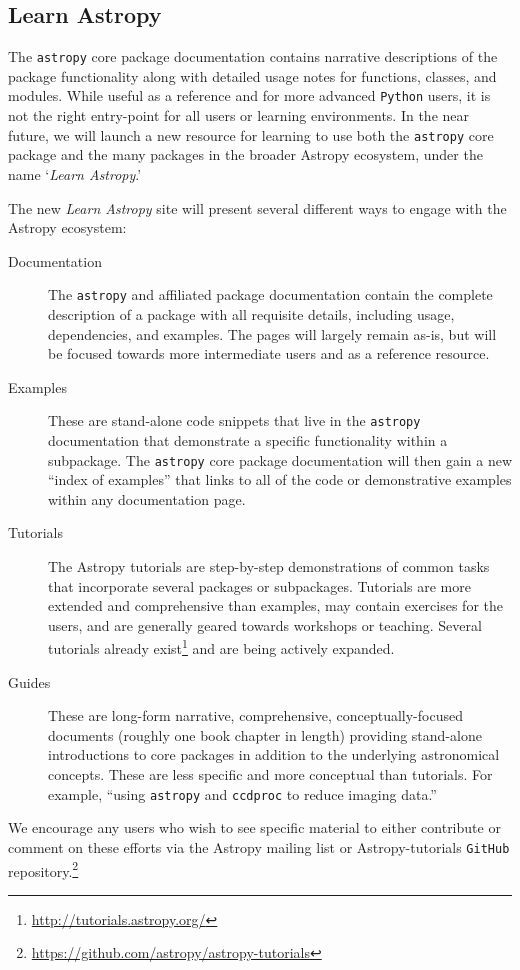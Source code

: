 \documentclass[modern]{aastex61}
\newcommand{\package}[1]{\texttt{#1}\xspace}
\newcommand{\github}{\package{GitHub}}
\newcommand{\python}{\package{Python}}
\newcommand{\astropy}{Astropy\xspace}
\newcommand{\astropypkg}{\package{astropy}}
\begin{document}
\subsection{Learn Astropy}

The \astropypkg core package documentation contains narrative descriptions of
the package functionality along with detailed usage notes for functions, classes, and modules.
While useful as a reference and for more advanced \python users, it is not the
right entry-point for all users or learning environments.
In the near future, we will launch a new resource for learning to use both the
\astropypkg core package and the many packages in the broader \astropy
ecosystem, under the name `\emph{Learn Astropy}.'

The new \emph{Learn Astropy} site will present several different ways to engage
with the \astropy ecosystem:
\begin{description}
    \item[Documentation] The \astropypkg and affiliated package documentation
        contain the complete description of a package with all requisite
        details, including usage, dependencies, and examples.
        The pages will largely remain as-is, but will be focused towards more
        intermediate users and as a reference resource.
    \item[Examples] These are stand-alone code snippets that live in the
        \astropypkg documentation that demonstrate a specific functionality
        within a subpackage.
        The \astropypkg core package documentation will then gain a new ``index
        of examples'' that links to all of the code or demonstrative examples
        within any documentation page.
    \item[Tutorials] The \astropy tutorials are step-by-step demonstrations of
        common tasks that incorporate several packages or subpackages.
        Tutorials are more extended and comprehensive than examples, may contain
        exercises for the users, and are generally geared towards workshops or
        teaching.
        Several tutorials already
        exist\footnote{\url{http://tutorials.astropy.org/}} and are being
        actively expanded.
    \item[Guides] These are long-form narrative, comprehensive,
        conceptually-focused documents (roughly one book chapter in length)
        providing stand-alone introductions to core packages in addition to the
        underlying astronomical concepts.
        These are less specific and more conceptual than tutorials.
        For example, ``using \astropypkg and \package{ccdproc} to reduce imaging
        data.''
\end{description}
We encourage any users who wish to see specific material to either contribute or
comment on these efforts via the \astropy mailing list or \astropy-tutorials
\github repository.\footnote{\url{https://github.com/astropy/astropy-tutorials}}
\end{document}
